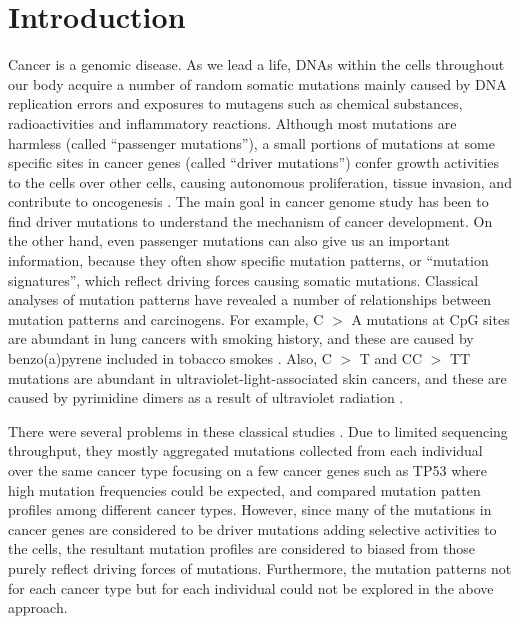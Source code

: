 \section*{Introduction}

Cancer is a genomic disease. 
As we lead a life, DNAs within the cells throughout our body acquire a number of random somatic mutations
mainly caused by DNA replication errors and exposures to mutagens such as chemical substances, radioactivities and inflammatory reactions.  
Although most mutations are harmless (called ``passenger mutations''), 
a small portions of mutations at some specific sites in cancer genes (called ``driver mutations'') 
confer growth activities to the cells over other cells,
causing autonomous proliferation, tissue invasion, and contribute to oncogenesis \cite{stratton2009cancer}.
The main goal in cancer genome study has been to find driver mutations to understand the mechanism of cancer development.
On the other hand,  even passenger mutations can also give us an important information, 
because they often show specific mutation patterns, or ``mutation signatures'', which reflect driving forces causing somatic mutations.
Classical analyses of mutation patterns have revealed a number of relationships between mutation patterns and carcinogens.
For example, C $>$ A mutations at CpG sites are abundant in lung cancers with smoking history,
and these are caused by benzo(a)pyrene included in tobacco smokes \cite{pmid12379884}.
Also, C $>$ T and CC $>$ TT  mutations are abundant in ultraviolet-light-associated skin cancers, 
and these are caused by pyrimidine dimers as a result of ultraviolet radiation \cite{pmid15748635}. 

There were several problems in these classical studies \cite{pmid12379884, pmid15748635}.
Due to limited sequencing throughput, 
they mostly aggregated mutations collected from each individual over the same cancer type focusing on a few cancer genes such as TP53
where high mutation frequencies could be expected,
and compared mutation patten profiles among different cancer types.
However, since many of the mutations in cancer genes are considered to be driver mutations adding selective activities to the cells,
the resultant mutation profiles are considered to biased from those purely reflect driving forces of mutations.
Furthermore, the mutation patterns not for each cancer type but for each individual could not be explored in the above approach.

